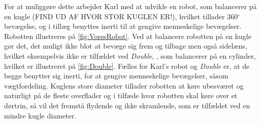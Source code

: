 For at muliggøre dette arbejder Karl med at udvikle en robot, som balancerer på en kugle (FIND UD AF HVOR STOR KUGLEN ER!), hvilket tillader 360$^{\circ}$ bevægelse, og i tillæg benyttes inerti til at gengive menneskelige bevægelser. Robotten illustreres på \autoref{fig:VoresRobot}. Ved at balancere robotten på en kugle gør det, det muligt ikke blot at bevæge sig frem og tilbage men også sidelæns, hvilket eksempelvis ikke er tilfældet ved \textit{Double}, \parencite{WEB:Double}, som balancerer på en cylinder, hvilket er illustreret på \autoref{fig:Double}. Fælles for Karl's robot og \textit{Double} er, at de begge benytter sig inerti, for at gengive menneskelige bevægelser, såsom vægtfordeling. Kuglens store diameter tillader robotten at køre ubesværet og naturligt på de fleste overflader og i tilfæde hvor robotten skal køre over et dørtrin, så vil det fremstå flydende og ikke skramlende, som er tilfældet ved en mindre kugle diameter. 
%
